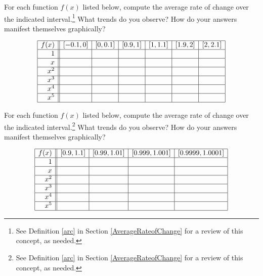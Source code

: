 \documentclass{ximera}
\begin{document}
\begin{problem}
For each function $f(x)$ listed below, compute the average rate of change over the indicated interval.\footnote{See Definition \ref{arc} in Section \ref{AverageRateofChange} for a review of this concept, as needed.}  What trends do you observe?  How do your answers manifest themselves graphically?

\[ \begin{array}{|r||c|c|c|c|c|c|}  \hline

 f(x) &  [-0.1, 0] & [0, 0.1] &[0.9, 1] & [1, 1.1] & [1.9, 2] & [2, 2.1]  \\ \hline
 1 &&&&&& \\  \hline
 x  &&&&&& \\  \hline
 x^2 &&&&&&  \\  \hline
 x^3 &&&&&& \\  \hline
 x^4 &&&&&& \\ \hline
 x^5 &&&&&& \\ \hline

\end{array} \]

\end{problem}


\begin{problem}\label{monomialarcexercise}
    For each function $f(x)$ listed below, compute the average rate of change over the indicated interval.\footnote{See Definition \ref{arc} in Section \ref{AverageRateofChange} for a review of this concept, as needed.}  What trends do you observe?  How do your answers manifest themselves graphically?

\[ \begin{array}{|r||c|c|c|c|}  \hline

 f(x) &  [0.9, 1.1] & [0.99, 1.01] &[0.999, 1.001] & [0.9999, 1.0001]  \\ \hline
 1 &&&&   \\  \hline
 x &&&&    \\  \hline
 x^2 &&&&   \\  \hline
 x^3 &&&&   \\  \hline
 x^4 &&&&  \\ \hline
 x^5 &&&&  \\ \hline

\end{array} \]

\end{problem}
 
\end{document}
